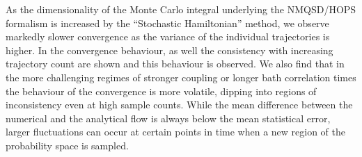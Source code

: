 As the dimensionality of the Monte Carlo integral underlying the
NMQSD/HOPS formalism is increased by the ``Stochastic Hamiltonian''
method, we observe markedly slower convergence as the variance of the
individual trajectories is higher.  In \label{fig:cons_dev_finite} the
convergence behaviour, as well the consistency with increasing
trajectory count are shown and this behaviour is observed. We also
find that in the more challenging regimes of stronger coupling or
longer bath correlation times the behaviour of the convergence is more
volatile, dipping into regions of inconsistency even at high sample
counts. While the mean difference between the numerical and the
analytical flow is always below the mean statistical error, larger
fluctuations can occur at certain points in time when a new region of
the probability space is sampled.

